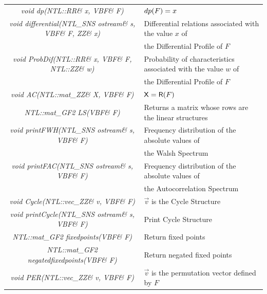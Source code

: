 \begin{table}[htbp]
{\begin{minipage}{\textwidth}
\begin{tabular}{ c l }
\textit{void dp(NTL::RR\& x, VBF\& F)} & $\crit{dp}(F)=x$ \\
\textit{void differential(NTL\_SNS ostream\& s, VBF\& F, ZZ\& x)} & Differential relations associated with the value $x$ of \\
 & the Differential Profile of $F$ \\
\textit{void ProbDif(NTL::RR\& x, VBF\& F, NTL::ZZ\& w)} & Probability of characteristics associated with the value $w$ of \\
 & the Differential Profile of $F$ \\
\textit{void AC(NTL::mat\_ZZ\& X, VBF\& F)} & $\matr{X}=\matr{R}(F)$ \\
\textit{NTL::mat\_GF2 LS(VBF\& F)} & Returns a matrix whose rows are the linear structures \\
\textit{void printFWH(NTL\_SNS ostream\& s, VBF\& F)} & Frequency distribution of the
absolute values of \\
& the Walsh Spectrum \\
\textit{void printFAC(NTL\_SNS ostream\& s, VBF\& F)} & Frequency distribution of the absolute values of \\
& the Autocorrelation Spectrum \\
\textit{void Cycle(NTL::vec\_ZZ\& v, VBF\& F)} & $\vec{v}$ is the Cycle Structure \\
\textit{void printCycle(NTL\_SNS ostream\& s, VBF\& F)} & Print Cycle Structure \\
\textit{NTL::mat\_GF2 fixedpoints(VBF\& F)} & Return fixed points \\
\textit{NTL::mat\_GF2 negatedfixedpoints(VBF\& F)} & Return negated fixed
points \\ 
\textit{void PER(NTL::vec\_ZZ\& v, VBF\& F)} & $\vec{v}$ is the permutation vector defined by $F$  \\
\bottomrule
\end{tabular}
\end{minipage}}
\end{table}







